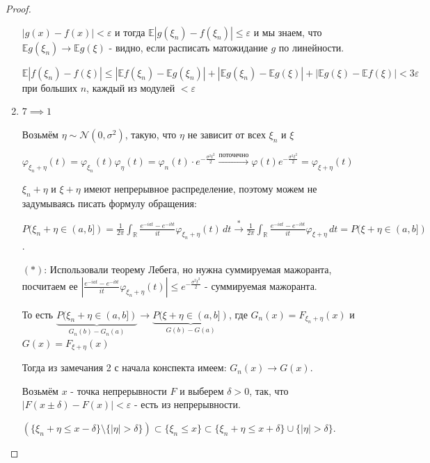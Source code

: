 \begin{proof}
\begin{enumerate}
{            $|g(x) - f(x)| < \varepsilon$ и тогда $\mathbb{E} |g(\xi_n) - f(\xi_n)| \leqslant \varepsilon$ и мы знаем, что $\mathbb{E}g(\xi_n) \rightarrow \mathbb{E}g(\xi)$ - видно, если расписать матожидание $g$ по линейности.

            $\mathbb{E} |f(\xi_n) - f(\xi)| \leqslant |\mathbb{E} f(\xi_n) - \mathbb{E} g(\xi_n)| + |\mathbb{E} g(\xi_n) - \mathbb{E} g(\xi)| + |\mathbb{E} g(\xi) - \mathbb{E} f(\xi) | < 3\varepsilon$ при больших $n$, каждый из модулей $< \varepsilon$
        }
        \item {
            $7 \implies 1$

            Возьмём $\eta \sim \mathcal{N} (0, \sigma^2)$, такую, что $\eta$ не зависит от всех $\xi_n$ и $\xi$

            $\varphi_{\xi_n + \eta} (t) = \varphi_{\xi_n} (t) \varphi_{\eta} (t) = \varphi_{n} (t) \cdot e^{-\frac{\sigma^2 t^2}{2}} \overset{\text{поточечно}}{\rightarrow} \varphi(t) e^{-\frac{\sigma^2t^2}{2}} = \varphi_{\xi + \eta} (t)$

            $\xi_n + \eta$ и $\xi + \eta$ имеют непрерывное распределение, поэтому можем не задумываясь писать формулу обращения:

            $P(\xi_n + \eta \in (a, b]) = \frac{1}{2\pi} \int_{\mathbb{R}} \frac{e^{-iat} - e^{-ibt}}{it} \varphi_{\xi_n + \eta} (t) \, dt \overset{*}{\rightarrow} \frac{1}{2\pi} \int_{\mathbb{R}} \frac{e^{-iat} - e^{-ibt}}{it} \varphi_{\xi + \eta} \, dt = P(\xi + \eta \in (a, b])$.

            $(*)$: Использовали теорему Лебега, но нужна суммируемая мажоранта, посчитаем ее $\left | \frac{e^{-iat} - e^{-ibt}}{it} \varphi_{\xi_n + \eta} (t) \right | \leqslant e^{-\frac{\sigma^2t^2}{2}}$ - суммируемая мажоранта.

            То есть $\underbrace{P(\xi_n + \eta \in (a, b])}_{G_n (b) - G_n(a)} \rightarrow \underbrace{P(\xi + \eta \in (a, b])}_{G(b) - G(a)}$, где $G_n (x) = F_{\xi_n + \eta}(x)$ и $G(x) = F_{\xi + \eta} (x)$

            Тогда из замечания 2 с начала конспекта имеем: $G_n(x) \rightarrow G(x)$.

            Возьмём $x$ - точка непрерывности $F$ и выберем $\delta > 0$, так, что $|F(x \pm \delta) - F(x)| < \varepsilon$ - есть из непрерывности.

            $ \left( \{ \xi_n + \eta \leqslant x - \delta \} \setminus \{ |\eta| > \delta \} \right) \subset  \{ \xi_n \leqslant x \} \subset \{ \xi_n + \eta \leqslant x + \delta \} \cup \{ |\eta| > \delta \}$.

}
\end{enumerate}
\end{proof}
